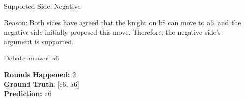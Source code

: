 \begin{tcolorbox}[breakable]
\begin{itemize}
\begin{itemize}
        Supported Side: Negative
        
        Reason: Both sides have agreed that the knight on b8 can move to a6, and the negative side initially proposed this move. Therefore, the negative side's argument is supported.
        
        Debate answer: a6
    \end{itemize}
\end{itemize}

\vspace{2mm}
\textbf{Rounds Happened:} 2 \\
\textbf{Ground Truth:} [c6, a6] \\
\textbf{Prediction:} a6

\end{tcolorbox}
